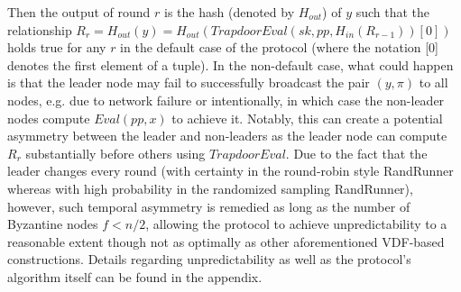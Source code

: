 \documentclass[letterpaper,twocolumn,10pt]{article}
\theoremstyle{definition}
\theoremstyle{remark}
\begin{document}
Then the output of round $r$ is the hash (denoted by $H_{out}$) of $y$ such that the relationship $R_r = H_{out}(y) = H_{out}(TrapdoorEval(sk, pp, H_{in}(R_{r - 1}))[0])$ holds true for any $r$ in the default case of the protocol (where the notation [0] denotes the first element of a tuple). In the non-default case, what could happen is that the leader node may fail to successfully broadcast the pair $(y, \pi)$ to all nodes, e.g. due to network failure or intentionally, in which case the non-leader nodes compute $Eval(pp, x)$ to achieve it. Notably, this can create a potential asymmetry between the leader and non-leaders as the leader node can compute $R_r$ substantially before others using $TrapdoorEval$. Due to the fact that the leader changes every round (with certainty in the round-robin style RandRunner whereas with high probability in the randomized sampling RandRunner), however, such temporal asymmetry is remedied as long as the number of Byzantine nodes $f < n / 2$, allowing the protocol to achieve unpredictability to a reasonable extent though not as optimally as other aforementioned VDF-based constructions. Details regarding unpredictability as well as the protocol's algorithm itself can be found in the appendix.

\printbibliography





\end{document}
